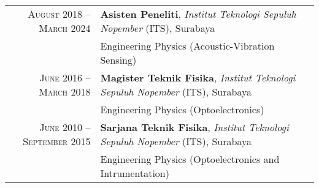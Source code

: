 %
%



\begin{tabular}{rl}
    \textsc{August 2018 -- March 2024} &  \textbf{Asisten Peneliti},  \emph{Institut Teknologi Sepuluh Nopember} (ITS), Surabaya\\
									&  Engineering Physics (Acoustic-Vibration Sensing) \\
	\textsc{June 2016 -- March 2018} &  \textbf{Magister Teknik Fisika},  \emph{Institut Teknologi Sepuluh Nopember} (ITS), Surabaya\\
									&  Engineering Physics (Optoelectronics) \\
	\textsc{June 2010 --September 2015} &  \textbf{Sarjana Teknik Fisika},  \emph{Institut Teknologi Sepuluh Nopember} (ITS), Surabaya\\
									&  Engineering Physics (Optoelectronics and Intrumentation) \\
\end{tabular}
